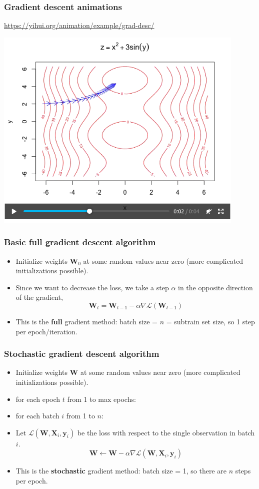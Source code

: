 \documentclass{beamer}
\begin{document}
\begin{frame}
  \frametitle{Gradient descent animations}
  \url{https://yihui.org/animation/example/grad-desc/}

  \includegraphics[width=0.9\textwidth]{screenshot-gradient-descent}
\end{frame}

\begin{frame}
  \frametitle{Basic full gradient descent algorithm}
  \begin{itemize}
  \item Initialize weights $\mathbf W_0$ at some random values near
    zero (more complicated initializations possible).
  \item Since we want to decrease the loss, we take a step $\alpha$ in the
    opposite direction of the gradient,
  $$
\mathbf W_t = \mathbf W_{t-1} - \alpha \nabla \mathcal L(\mathbf W_{t-1})
$$
\item This is the \textbf{full} gradient method: batch size = $n$ =
  subtrain set size, so 1 step per epoch/iteration.
  \end{itemize}
\end{frame}

\begin{frame}
  \frametitle{Stochastic gradient descent algorithm}
  \begin{itemize}
  \item Initialize weights $\mathbf W$ at some random values near
    zero (more complicated initializations possible).
  \item for each epoch $t$ from 1 to max epochs:
  \item for each batch $i$ from 1 to $n$:
  \item Let $\mathcal L( \mathbf W, \mathbf X_i, \mathbf y_i )$ be the loss with
    respect to the single observation in batch $i$.
  $$
\mathbf W \gets \mathbf W - \alpha \nabla \mathcal L(\mathbf W, \mathbf X_i, \mathbf y_i)
$$
\item This is the \textbf{stochastic} gradient method: batch size = 1,
  so there are $n$ steps per epoch.
  \end{itemize}
\end{frame}
\end{document}
